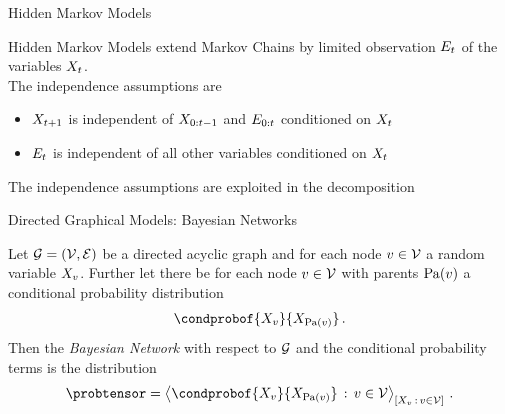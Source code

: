 \documentclass{beamer}
\begin{document}
\begin{frame}{Hidden Markov Models}

    Hidden Markov Models extend Markov Chains by limited observation $E_{t}$ of the variables $X_{t}$. \\
    \medskip
    The independence assumptions are
    \begin{itemize}
        \item $X_{t+1}$ is independent of $X_{0:t-1}$ and $E_{0:t}$ conditioned on $X_{t}$
        \item $E_{t}$ is independent of all other variables conditioned on $X_{t}$
    \end{itemize}
    \medskip
    The independence assumptions are exploited in the decomposition
    \begin{center}
        
    \end{center}

\end{frame}



\begin{frame}{Directed Graphical Models: Bayesian Networks}

    \begin{definition}
	Let $\mathcal{G}=(\mathcal{V},\mathcal{E})$ be a directed acyclic graph and for each node $v\in\mathcal{V}$ a random variable $X_{v}$.
    Further let there be for each node $v\in\mathcal{V}$ with parents $\mathrm{Pa}(v)$ a conditional probability distribution
    \[ \condprobof{\catvariableof{\node}}{\catvariableof{\parentsof{\node}}} \, . \]
    Then the \emph{Bayesian Network} with respect to $\mathcal{G}$ and the conditional probability terms is the distribution
    \begin{align*}
        \probtensor = \contractionof{\condprobof{\catvariableof{\node}}{\catvariableof{\parentsof{\node}}} \, : \, \nodein}{\catvariableof{\node} \, : \, \nodein} \, .
    \end{align*}
    \end{definition}

\end{frame}
\end{document}
